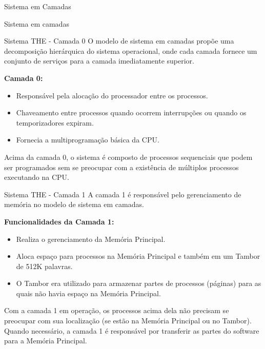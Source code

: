 \documentclass{beamer}
\begin{document}
\begin{frame}{Sistema em Camadas}
\begin{frame}{Sistema em camadas}
\end{frame}



\begin{frame}{Sistema THE -  Camada 0}
    O modelo de sistema em camadas propõe uma decomposição hierárquica do sistema operacional, onde cada camada fornece um conjunto de serviços para a camada imediatamente superior.

    \vspace{0.5cm}

    \textbf{Camada 0:}
    \begin{itemize}
        \item Responsável pela alocação do processador entre os processos.
        \item Chaveamento entre processos quando ocorrem interrupções ou quando os temporizadores expiram.
        \item Fornecia a multiprogramação básica da CPU.
    \end{itemize}

    \vspace{0.5cm}

    Acima da camada 0, o sistema é composto de processos sequenciais que podem ser programados sem se preocupar com a existência de múltiplos processos executando na CPU.
\end{frame}
\begin{frame}{Sistema THE -  Camada 1}
    A camada 1 é responsável pelo gerenciamento de memória no modelo de sistema em camadas.

    \vspace{0.5cm}

    \textbf{Funcionalidades da Camada 1:}
    \begin{itemize}
        \item Realiza o gerenciamento da Memória Principal.
        \item Aloca espaço para processos na Memória Principal e também em um Tambor de 512K palavras.
        \item O Tambor era utilizado para armazenar partes de processos (páginas) para as quais não havia espaço na Memória Principal.
    \end{itemize}

    \vspace{0.5cm}

    Com a camada 1 em operação, os processos acima dela não precisam se preocupar com sua localização (se estão na Memória Principal ou no Tambor). Quando necessário, a camada 1 é responsável por transferir as partes do software para a Memória Principal.
\end{frame}


\end{frame}
\end{document}
